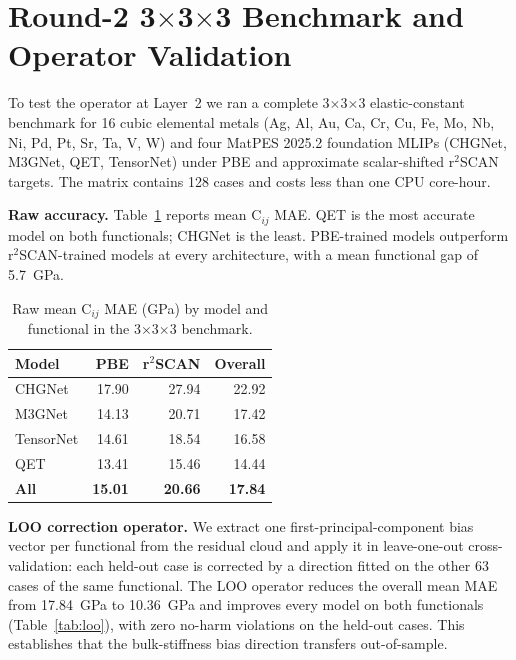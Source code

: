 \documentclass[11pt]{article}
\begin{document}
\section{Round-2 3$\times$3$\times$3 Benchmark and Operator Validation}
\label{sec:round2}

To test the operator at Layer~2 we ran a complete 3$\times$3$\times$3
elastic-constant benchmark for 16 cubic elemental metals (Ag, Al, Au, Ca, Cr,
Cu, Fe, Mo, Nb, Ni, Pd, Pt, Sr, Ta, V, W) and four MatPES 2025.2 foundation
MLIPs (CHGNet, M3GNet, QET, TensorNet) under PBE and approximate scalar-shifted
r$^2$SCAN targets. The matrix contains 128 cases and costs less than one CPU
core-hour.

\textbf{Raw accuracy.} Table~\ref{tab:raw} reports mean C$_{ij}$ MAE. QET is
the most accurate model on both functionals; CHGNet is the least. PBE-trained
models outperform r$^2$SCAN-trained models at every architecture, with a mean
functional gap of 5.7~GPa.

\begin{table}[h]
\centering
\caption{Raw mean C$_{ij}$ MAE (GPa) by model and functional in the 3$\times$3$\times$3 benchmark.}
\label{tab:raw}
\begin{tabular}{lrrr}
\toprule
Model & PBE & r$^2$SCAN & Overall \\
\midrule
CHGNet & 17.90 & 27.94 & 22.92 \\
M3GNet & 14.13 & 20.71 & 17.42 \\
TensorNet & 14.61 & 18.54 & 16.58 \\
QET & 13.41 & 15.46 & 14.44 \\
\textbf{All} & \textbf{15.01} & \textbf{20.66} & \textbf{17.84} \\
\bottomrule
\end{tabular}
\end{table}

\textbf{LOO correction operator.} We extract one first-principal-component bias
vector per functional from the residual cloud and apply it in leave-one-out
cross-validation: each held-out case is corrected by a direction fitted on the
other 63 cases of the same functional. The LOO operator reduces the overall
mean MAE from 17.84~GPa to 10.36~GPa and improves every model on both
functionals (Table~\ref{tab:loo}), with zero no-harm violations on the
held-out cases. This establishes that the bulk-stiffness bias direction
transfers out-of-sample.
\end{document}
